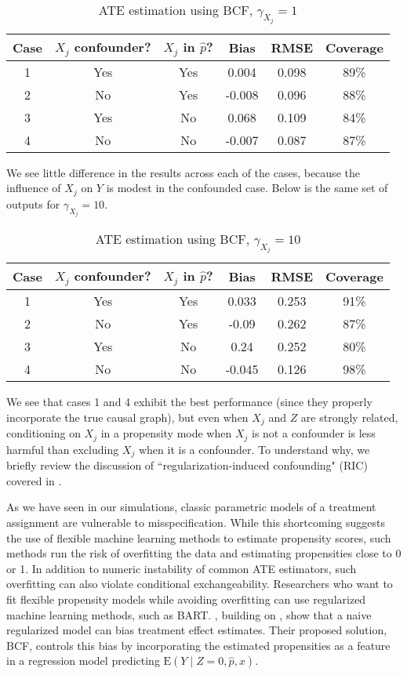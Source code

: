 \documentclass[aos]{imsart}
\newcommand{\E}{\mbox{E}}
\begin{document}
\begin{table}[ht]
\centering
\begingroup\small
\begin{tabular}{cccccc}
  \hline
Case & $X_j$ confounder? & $X_j$ in $\hat{p}$? & Bias & RMSE & Coverage \\ 
  \hline
1 & Yes & Yes & 0.004 & 0.098 & 89\% \\ 
2 & No & Yes & -0.008 & 0.096 & 88\% \\ 
3 & Yes & No & 0.068 & 0.109 & 84\% \\ 
4 & No & No & -0.007 & 0.087 & 87\% \\ 
   \hline
\end{tabular}
\endgroup
\caption{ATE estimation using BCF, $\gamma_{X_j} = 1$} 
\end{table}
We see little difference in the results across each of the cases, because the influence of $X_j$ on $Y$ is modest in the confounded case. 
Below is the same set of outputs for $\gamma_{X_j} = 10$.

\begin{table}[ht]
\centering
\begingroup\small
\begin{tabular}{cccccc}
  \hline
Case & $X_j$ confounder? & $X_j$ in $\hat{p}$? & Bias & RMSE & Coverage \\ 
  \hline
1 & Yes & Yes & 0.033 & 0.253 & 91\% \\ 
2 & No & Yes & -0.09 & 0.262 & 87\% \\ 
3 & Yes & No & 0.24 & 0.252 & 80\% \\ 
4 & No & No & -0.045 & 0.126 & 98\% \\ 
   \hline
\end{tabular}
\endgroup
\caption{ATE estimation using BCF, $\gamma_{X_j} = 10$} 
\end{table}

We see that cases 1 and 4 exhibit the best performance (since they properly incorporate the true 
causal graph), but even when $X_j$ and $Z$ are strongly related, conditioning on $X_j$ in a propensity mode 
when $X_j$ is not a confounder is less harmful than excluding $X_j$ when it is a confounder. 
To understand why, we briefly review the discussion of ``regularization-induced confounding" (RIC) covered in \cite{hahn2020bayesian}.

As we have seen in our simulations, classic parametric models of a treatment assignment are vulnerable to 
misspecification. While this shortcoming suggests the use of flexible machine learning methods to estimate propensity scores, such methods run the risk of overfitting the data and estimating propensities close to 0 or 1. 
In addition to numeric instability of common ATE estimators, such overfitting can also violate conditional exchangeability. 
Researchers who want to fit flexible propensity models while avoiding overfitting can use regularized machine learning methods, such as BART. \cite{hahn2020bayesian}, building on \cite{hahn2018regularization}, show that a naive regularized model can bias treatment effect estimates. 
Their proposed solution, BCF, controls this bias by incorporating the estimated propensities as a feature in a regression model predicting $\E(Y \mid Z = 0, \hat{p}, x)$.
\end{document}
